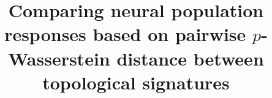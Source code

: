 \documentclass[9pt,conference]{IEEEtran}
\begin{document}
%
\title{Comparing neural population responses based on pairwise $p$-Wasserstein distance between topological signatures}


\author{}


% 




\maketitle

%
\IEEEpeerreviewmaketitle
\end{document}

